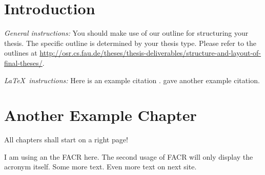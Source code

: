 \chapter{Introduction}
\label{chapter:example}

{\textsl{General instructions:}} 
You should make use of our outline for structuring your
thesis. The specific outline is determined by your thesis type.
Please refer to the outlines at 
\url{http://osr.cs.fau.de/theses/thesis-deliverables/structure-and-layout-of-final-theses/}.

{\textsl{\LaTeX\ instructions:}} Here is an example citation
\autocite{riehle:2011:controlling}.
\textcite{riehle:2007:economic} gave another example citation.


\chapter{Another Example Chapter}
\label{cahpter:another-example}

All chapters shall start on a right page!

I am using an the \ac{FACR} here. The second usage of \ac{FACR} will only display the acronym itself.
\newpage
Some more text.
\newpage
Even more text on next site.